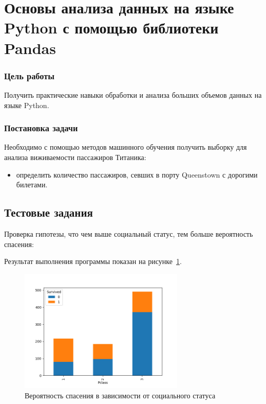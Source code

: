 



\newcommand{\labnumber}{1} %



\graphicspath{{figures/}}


\Ukrainian


\addtocounter{page}{1}

\section*{Основы анализа данных на языке Python с помощью библиотеки Pandas}
\subsubsection*{Цель работы}
Получить практические навыки обработки и анализа больших
объемов данных на языке Python.
\subsubsection*{Постановка задачи}
Необходимо с помощью методов машинного обучения получить выборку для анализа виживаемости пассажиров Титаника:
\begin{itemize}
  \item определить количество пассажиров, севших в порту Queenstown с дорогими билетами.
\end{itemize}

\subsection*{Тестовые задания}
Проверка гипотезы, что чем выше социальный статус, тем больше вероятность спасения:
 

Результат выполнения программы показан на рисунке~\ref{fig:example1}.

\begin{figure}[H]
    \centering
        \includegraphics[width=0.7\textwidth]{example1}
    \caption{Вероятность спасения в зависимости от социального статуса}
    \label{fig:example1}
\end{figure}

